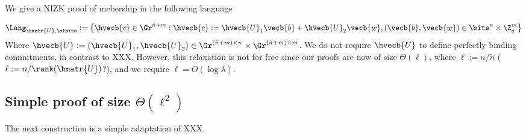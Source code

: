 We give a NIZK proof of mebership in the following language

$$
\Lang_{\hmatr{U},\sfbits} :=
\left\{
\hvecb{c}\in\Gr^{\tilde{n}+m} :
\hvecb{c}:=\hvecb{U}_1\vecb{b}+\hvecb{U}_2\vecb{w},
(\vecb{b},\vecb{w})\in\bits^{n}\times\Z_q^m
\right\}
$$
Where $\hvecb{U}:=(\hvecb{U}_1,\hvecb{U}_2)\in\Gr^{(\tilde{n}+m)\times n}\times\Gr^{(\tilde{n}+m)\times m}$. We do not require $\hvecb{U}$ to define perfectly binding commitments, in contrast to XXX. However, this relaxation is not for free since our proofs are now of size $\Theta(\ell)$, where $\ell:=n/\tilde{n}$ ($\ell:=n/\rank(\hmatr{U})$?), and we require $\ell = O(\log \lambda)$.

\subsection{Simple proof of size $\Theta(\ell^2)$}

The next construction is a simple adaptation of XXX.

